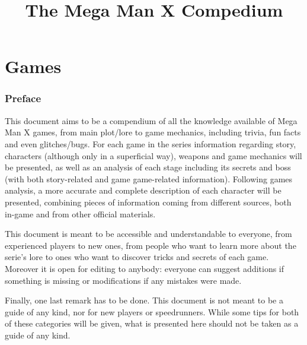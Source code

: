 \documentclass[openany]{report}
\title{The Mega Man X Compedium}
\begin{document}
\begin{titlepage}
	\maketitle
	\thispagestyle{empty}
\end{titlepage}



\tableofcontents

\part{Games}
	\section*{Preface}
	This document aims to be a compendium of all the knowledge available of Mega Man X games, from main plot/lore to game mechanics, including trivia, fun facts and even glitches/bugs. For each game in the series information regarding story, characters (although only in a superficial way), weapons and game mechanics will be presented, as well as an analysis of each stage including its secrets and boss (with both story-related and game game-related information). Following games analysis, a more accurate and complete description of each character will be presented, combining pieces of information coming from different sources, both in-game and from other official materials.
	
	This document is meant to be accessible and understandable to everyone, from experienced players to new ones, from people who want to learn more about the serie’s lore to ones who want to discover tricks and secrets of each game. Moreover it is open for editing to anybody: everyone can suggest additions if something is missing or modifications if any mistakes were made.
	
	Finally, one last remark has to be done. This document is not meant to be a guide of any kind, nor for new players or speedrunners. While some tips for both of these categories will be given, what is presented here should not be taken as a guide of any kind.
	
\end{document}
